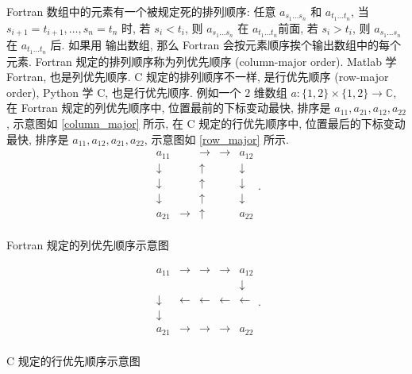 \def\la{\leftarrow}
\def\ra{\rightarrow}
\def\ua{\uparrow}
\def\da{\downarrow}
Fortran 数组中的元素有一个被规定死的排列顺序: 任意 $a_{s_1\dots s_n}$ 和 $a_{t_1\dots t_n}$, 当 $s_{i+1}=t_{i+1}, \dots, s_n=t_n$ 时, 若 $s_i<t_i$, 则 $a_{s_1\dots s_n}$ 在 $a_{t_1\dots t_n}$前面, 若 $s_i>t_i$, 则 $a_{s_1\dots s_n}$ 在 $a_{t_1\dots t_n}$ 后. 如果用  输出数组, 那么 Fortran 会按元素顺序挨个输出数组中的每个元素. Fortran 规定的排列顺序称为列优先顺序 (column-major order). Matlab 学 Fortran, 也是列优先顺序. C 规定的排列顺序不一样, 是行优先顺序 (row-major order), Python 学 C, 也是行优先顺序. 例如一个 $2$ 维数组 $a\colon \{1,2\}\times\{1,2\}\to\mathbb{C}$, 在 Fortran 规定的列优先顺序中, 位置最前的下标变动最快, 排序是 $a_{11},a_{21},a_{12},a_{22}$, 示意图如 \ref{column_major} 所示, 在 C 规定的行优先顺序中, 位置最后的下标变动最快, 排序是 $a_{11},a_{12},a_{21},a_{22}$, 示意图如 \ref{row_major} 所示.
\begin{equation}
    \begin{matrix}
        a_{11}&&\ra&\ra&a_{12}\\
        \da&&\ua&&\da\\
        \da&&\ua&&\da\\
        \da&&\ua&&\da\\
        a_{21}&\ra&\ua&&a_{22}\\
    \end{matrix}.\label{column_major}
\end{equation}
\begin{center}
    Fortran 规定的列优先顺序示意图
\end{center}
\begin{equation}
    \begin{matrix}
        a_{11}&\ra&\ra&\ra&a_{12}\\
        &&&&\da\\
        \da&\la&\la&\la&\la\\
        \da&&&&\\
        a_{21}&\ra&\ra&\ra&a_{22}\\
    \end{matrix}.\label{row_major}
\end{equation}
\begin{center}
    C 规定的行优先顺序示意图
\end{center}

